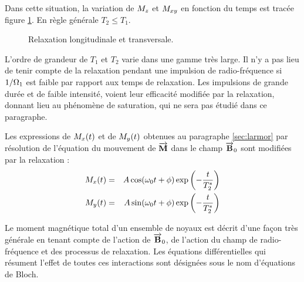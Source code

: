 Dans cette situation, la variation de $M_z$ et $M_{xy}$ en fonction du temps 
est tracée figure \ref{fig:relax}.
En règle générale $T_2 \le T_1$.

\begin{figure}[hbt]
\begin{center}
\hspace{0.25in}
\end{center}
\caption{Relaxation longitudinale et transversale.}
\label{fig:relax}
\end{figure}

L'ordre de grandeur de $T_1$ et $T_2$ varie dans une gamme très large.
Il n'y a pas lieu de tenir compte de la relaxation pendant une impulsion de radio-fréquence
si $1/\Omega_1$ est faible par rapport aux temps de relaxation.
Les impulsions de grande durée et de faible intensité, voient leur efficacité modifiée par la
relaxation, donnant lieu au phénomène de saturation, qui ne sera pas étudié dans ce paragraphe.

Les expressions de $M_x (t)$ et de $M_y (t)$ obtenues au paragraphe \ref{sec:larmor}
par résolution de l'équation du mouvement de $\overrightarrow{\mathbf{M}}$ dans le champ
$\overrightarrow{\mathbf{B}}_0$ sont modifiées par la relaxation :
\begin{eqnarray}
M_x (t) & = & A\cos(\omega_0 t + \phi) \exp \left( -\frac{t}{T_2^*} \right) \\
M_y (t) & = & A\sin(\omega_0 t + \phi) \exp \left( -\frac{t}{T_2^*} \right)
\end{eqnarray}

Le moment magnétique total d'un ensemble de noyaux est décrit d'une façon très
générale en tenant compte de l'action de $\overrightarrow{\mathbf{B}}_0$, de l'action du champ de
radio-fréquence et des processus de relaxation.
Les équations différentielles qui résument l'effet de toutes ces
interactions sont désignées sous le nom d'équations de Bloch.

